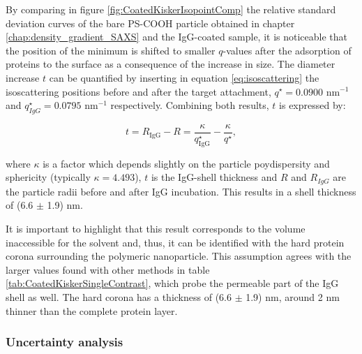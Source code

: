 By comparing in figure \ref{fig:CoatedKiskerIsopointComp} the relative standard deviation curves of the bare PS-COOH particle obtained in chapter \ref{chap:density_gradient_SAXS} and the IgG-coated sample, it is noticeable that the position of the minimum is shifted to smaller $q$-values after the adsorption of proteins to the surface as a consequence of the increase in size. The diameter increase $t$ can be quantified by inserting in equation \ref{eq:isoscattering} the isoscattering positions before and after the target attachment, $q^{\star}=0.0900$ nm$^{-1}$ and $q^{\star}_{IgG}=0.0795$ nm$^{-1}$ respectively. Combining both results, $t$ is expressed by:


\begin{equation}
t = R_{\text{IgG}} - R = \frac{\kappa}{q^{\star}_{\text{IgG}}}-\frac{\kappa}{q^{\star}} ,
\label{eq:IsopointRadiusDifference}
\end{equation}

where $\kappa$ is a factor which depends slightly on the particle poydispersity and sphericity (typically $\kappa = 4.493$), $t$ is the IgG-shell thickness and $R$ and $R_{IgG}$ are the particle radii before and after IgG incubation. This results in a shell thickness of (6.6 $\pm$ 1.9) nm. 

It is important to highlight that this result corresponds to the volume inaccessible for the solvent and, thus, it can be identified with the hard protein corona surrounding the polymeric nanoparticle. This assumption agrees with the larger values found with other methods in table \ref{tab:CoatedKiskerSingleContrast}, which probe the permeable part of the IgG shell as well. The hard corona has a thickness of (6.6 $\pm$ 1.9) nm, around 2 nm thinner than the complete protein layer.

\subsubsection{Uncertainty analysis}

